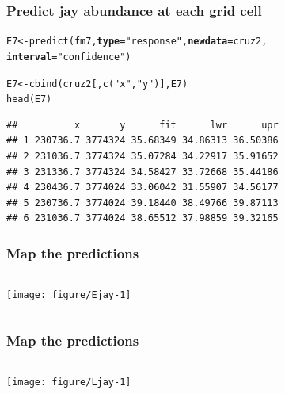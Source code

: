 \documentclass[color=usenames,dvipsnames]{beamer}\usepackage[]{graphicx}\usepackage[]{color}
\makeatletter
\newcommand{\hlstr}[1]{\textcolor[rgb]{0.749,0.012,0.012}{#1}}%
\newcommand{\hlstd}[1]{\textcolor[rgb]{0,0,0}{#1}}%
\newcommand{\hlkwb}[1]{\textcolor[rgb]{0,0.341,0.682}{#1}}%
\newcommand{\hlkwc}[1]{\textcolor[rgb]{0,0,0}{\textbf{#1}}}%
\newcommand{\hlkwd}[1]{\textcolor[rgb]{0.004,0.004,0.506}{#1}}%
\newenvironment{kframe}{%
 \def\at@end@of@kframe{}%
 \ifinner\ifhmode%
  \def\at@end@of@kframe{\end{minipage}}%
  \begin{minipage}{\columnwidth}%
 \fi\fi%
 \def\FrameCommand##1{\hskip\@totalleftmargin \hskip-\fboxsep
 \colorbox{shadecolor}{##1}\hskip-\fboxsep
     \hskip-\linewidth \hskip-\@totalleftmargin \hskip\columnwidth}%
 \MakeFramed {\advance\hsize-\width
   \@totalleftmargin\z@ \linewidth\hsize
   \@setminipage}}%
 {\par\unskip\endMakeFramed%
 \at@end@of@kframe}
\newenvironment{knitrout}{}{} %
\makeatother
\begin{document}
\begin{frame}[fragile]
  \frametitle{Predict jay abundance at each grid cell}
\begin{knitrout}
\color{fgcolor}\begin{kframe}
\begin{alltt}
\hlstd{E7} \hlkwb{<-} \hlkwd{predict}\hlstd{(fm7,} \hlkwc{type}\hlstd{=}\hlstr{"response"}\hlstd{,} \hlkwc{newdata}\hlstd{=cruz2,}
              \hlkwc{interval}\hlstd{=}\hlstr{"confidence"}\hlstd{)}
\end{alltt}
\end{kframe}
\end{knitrout}
\pause
\begin{knitrout}
\color{fgcolor}\begin{kframe}
\begin{alltt}
\hlstd{E7} \hlkwb{<-} \hlkwd{cbind}\hlstd{(cruz2[,}\hlkwd{c}\hlstd{(}\hlstr{"x"}\hlstd{,}\hlstr{"y"}\hlstd{)], E7)}
\hlkwd{head}\hlstd{(E7)}
\end{alltt}
\begin{verbatim}
##          x       y      fit      lwr      upr
## 1 230736.7 3774324 35.68349 34.86313 36.50386
## 2 231036.7 3774324 35.07284 34.22917 35.91652
## 3 231336.7 3774324 34.58427 33.72668 35.44186
## 4 230436.7 3774024 33.06042 31.55907 34.56177
## 5 230736.7 3774024 39.18440 38.49766 39.87113
## 6 231036.7 3774024 38.65512 37.98859 39.32165
\end{verbatim}
\end{kframe}
\end{knitrout}
\end{frame}


\begin{frame}[fragile]
  \frametitle{Map the predictions}
  \scriptsize

\begin{columns}
  \column{\dimexpr\paperwidth-10pt}
  \texttt{[image: figure/Ejay-1]}
\end{columns}
\end{frame}




\begin{frame}[fragile]
  \frametitle{Map the predictions}
  \scriptsize

\begin{columns}
  \column{\dimexpr\paperwidth-10pt}
  \texttt{[image: figure/Ljay-1]}
\end{columns}
\end{frame}
\end{document}
